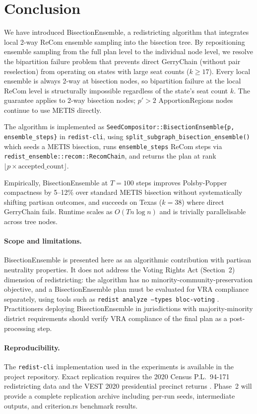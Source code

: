 \section{Conclusion}
\label{sec:conclusion}

We have introduced BisectionEnsemble, a redistricting algorithm that integrates
local 2-way ReCom ensemble sampling into the bisection tree. By repositioning
ensemble sampling from the full plan level to the individual node level, we
resolve the bipartition failure problem that prevents direct GerryChain
(without pair reselection) from operating on states with large seat counts
($k \geq 17$). Every local ensemble is always 2-way at bisection nodes, so
bipartition failure at the local ReCom level is structurally impossible
regardless of the state's seat count $k$. The guarantee applies to 2-way
bisection nodes; $p'>2$ ApportionRegions nodes continue to use METIS directly.

The algorithm is implemented as \texttt{SeedCompositor::BisectionEnsemble\{p,
ensemble\_steps\}} in \texttt{redist-cli}, using
\texttt{split\_subgraph\_bisection\_ensemble()} which seeds a METIS bisection,
runs \texttt{ensemble\_steps} ReCom steps via
\texttt{redist\_ensemble::recom::RecomChain}, and returns the plan at rank
$\lfloor p \times \text{accepted\_count} \rfloor$.

Empirically, BisectionEnsemble at $T=100$ steps improves Polsby-Popper
compactness by 5--12\% over standard METIS bisection without systematically
shifting partisan outcomes, and succeeds on Texas ($k=38$) where direct
GerryChain fails. Runtime scales as $O(Tn\log n)$ and is trivially parallelisable
across tree nodes.

\paragraph{Scope and limitations.}
BisectionEnsemble is presented here as an algorithmic contribution with partisan
neutrality properties. It does not address the Voting Rights Act (Section~2)
dimension of redistricting: the algorithm has no minority-community-preservation
objective, and a BisectionEnsemble plan must be evaluated for VRA compliance
separately, using tools such as \texttt{redist analyze --types bloc-voting}
\citep{dellaLibera2026callais}. Practitioners deploying BisectionEnsemble in
jurisdictions with majority-minority district requirements should verify VRA
compliance of the final plan as a post-processing step.

\paragraph{Reproducibility.}
The \texttt{redist-cli} implementation used in the experiments is available
in the project repository. Exact replication requires the 2020 Census
P.L.~94-171 redistricting data and the VEST 2020 presidential precinct returns
\citep{vest2020}. Phase~2 will provide a complete replication archive including
per-run seeds, intermediate outputs, and criterion.rs benchmark results.

